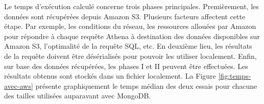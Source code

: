 Le temps d'exécution calculé concerne trois phases principales. Premièrement,  les données sont récupérées depuis Amazon S3. Plusieurs facteurs affectent cette étape. Par exemple,  les conditions du réseau, les ressources allouées par Amazon pour répondre à chaque requête  Athena à destination des données disponibles sur Amazon S3, l'optimalité de la requête SQL, etc.
En deuxième lieu, les résultats de la requête doivent être désérialisés pour pouvoir les utiliser localement. Enfin, sur base des données récupérées, les phases I et II peuvent être effectuées. Les résultats obtenus sont stockés dans un fichier localement.
%
%
%	
%		
La Figure \ref{fig:temps-avec-aws} présente graphiquement le temps médian des deux  essais pour chacune des tailles utilisées auparavant avec MongoDB. 

